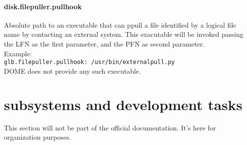 \documentclass[a4paper,10pt]{scrreprt}
\begin{document}
\subsubsection{disk.filepuller.pullhook}

Absolute path to an executable that can ppull a file identified by a logical file name by contacting an external system. This exacutable
will be invoked passing the LFN as the first parameter, and the PFN as second parameter.\\

Example:\\
\lstinline"glb.filepuller.pullhook: /usr/bin/externalpull.py"\\

DOME does not provide any such executable.\\

\chapter{subsystems and development tasks}
This section will not be part of the official documentation. It's here for organization purposes.\\
\end{document}
